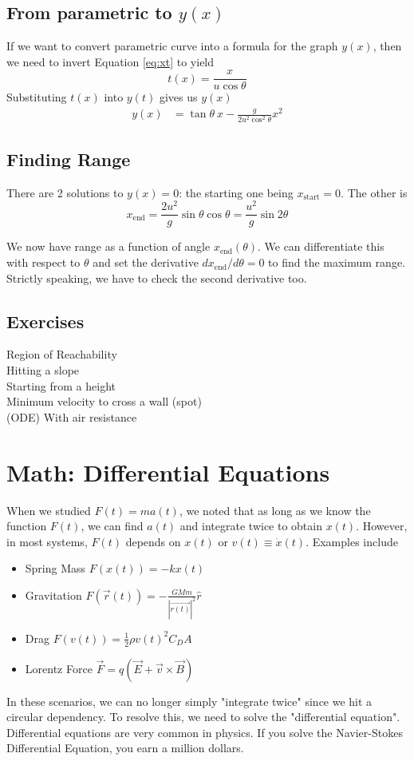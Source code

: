 \documentclass{article}
\begin{document}
\subsection{From parametric to $y(x)$}
If we want to convert parametric curve into a formula for the graph $y(x)$, then we need to invert Equation \ref{eq:xt} to yield $$t(x) = {\frac{x}{u \cos \theta}}$$
Substituting $t(x)$ into $y(t)$ gives us $y(x)$
\begin{align}
    y(x) &= \tan \theta\ x - \frac{g}{2u^2 \cos^2 \theta} x^2
\end{align}
\subsection{Finding Range}
There are 2 solutions to $y(x) = 0$: the starting one being $x_{\text{start}}=0$. The other is 
$$x_{\text{end}} = \frac{2u^2}{g} \sin \theta \cos \theta = \frac{u^2}{g} \sin 2\theta$$

We now have range as a function of angle $x_{\text{end}}(\theta)$. We can differentiate this with respect to $\theta$ and set the derivative $dx_{\text{end}}/d\theta = 0$ to find the maximum range. Strictly speaking, we have to check the second derivative too.
\subsection{Exercises}
Region of Reachability\\
Hitting a slope\\
Starting from a height \\
Minimum velocity to cross a wall (spot)\\
(ODE) With air resistance
\section{Math: Differential Equations}
When we studied $F(t)=ma(t)$, we noted that as long as we know the function $F(t)$, we can find $a(t)$ and integrate twice to obtain $x(t)$. However, in most systems, $F(t)$ depends on $x(t)$ or $v(t) \equiv \dot{x}(t)$. Examples include 
\begin{itemize}
    \item Spring Mass $F(x(t)) = -kx(t)$
    \item Gravitation $F(\vec{r}(t)) = -\frac{GMm}{|\vec{r(t)}|^2} \hat{r}$
    \item Drag $F(v(t)) = \frac{1}{2} \rho v(t)^2 C_D A$
    \item Lorentz Force $\vec{F} = q(\vec{E} + \vec{v} \times \vec{B})$
\end{itemize}
In these scenarios, we can no longer simply "integrate twice" since we hit a circular dependency. To resolve this, we need to solve the "differential equation". Differential equations are very common in physics. If you solve the Navier-Stokes Differential Equation, you earn a million dollars.
\end{document}
